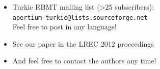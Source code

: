 \documentclass[a0paper,fontscale=0.3]{baposter}  %
\begin{document}
\begin{poster}
{\begin{itemize}
				\item Turkic RBMT mailing list (>25 subscribers):\\
				\texttt{apertium-turkic@lists.sourceforge.net}\\
				\vspace{-0.5ex}Feel free to post in any language!\\\vspace{-2.5ex}
				\item See our paper in the LREC 2012 proceedings
				\item And feel free to contact the authors any time!
			\end{itemize}
			\vspace{2.8ex}
		}




	\end{poster}
\end{document}
